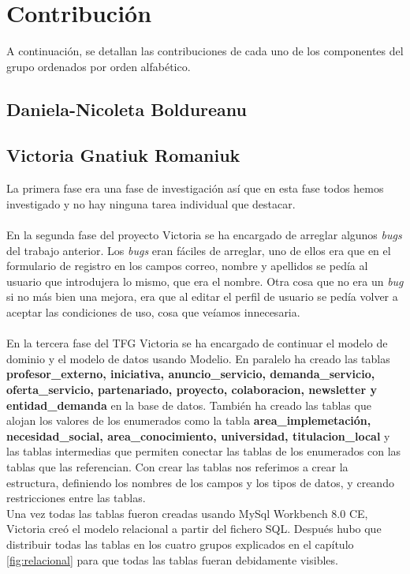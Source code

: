 \documentclass[11pt]{book}
\begin{document}
	\chapter{Contribución}
	A continuación, se detallan las contribuciones de cada uno de los componentes del grupo ordenados por orden alfabético.
	\section{Daniela-Nicoleta Boldureanu}
	\section{Victoria Gnatiuk Romaniuk}
	La primera fase era una fase de investigación así que en esta fase todos hemos investigado y no hay ninguna tarea individual que destacar.\\\\
	En la segunda fase del proyecto Victoria se ha encargado de arreglar algunos \textit{bugs} del trabajo anterior. Los \textit{bugs} eran fáciles de arreglar, uno de ellos era que en el formulario de registro en los campos correo, nombre y apellidos se pedía al usuario que introdujera lo mismo, que era el nombre. Otra cosa que no era un \textit{bug} si no más bien una mejora, era que al editar el perfil de usuario se pedía volver a aceptar las condiciones de uso, cosa que veíamos innecesaria.\\\\
	En la tercera fase del TFG Victoria se ha encargado de continuar el modelo de dominio y el modelo de datos usando Modelio. En paralelo ha creado las tablas \textbf{profesor\_externo, iniciativa, anuncio\_servicio, demanda\_servicio, oferta\_servicio, partenariado, proyecto, colaboracion, newsletter y entidad\_demanda} en la base de datos. También ha creado las tablas que alojan los valores de los enumerados como la tabla \textbf{area\_implemetación, necesidad\_social, area\_conocimiento, universidad, titulacion\_local} y las tablas intermedias que permiten conectar las tablas de los enumerados con las tablas que las referencian. Con crear las tablas nos referimos a crear la estructura, definiendo los nombres de los campos y los tipos de datos, y creando restricciones entre las tablas.\\
	Una vez todas las tablas fueron creadas usando MySql Workbench 8.0 CE, Victoria creó el modelo relacional a partir del fichero SQL. Después hubo que distribuir todas las tablas en los cuatro grupos explicados en el capítulo \ref{fig:relacional} para que todas las tablas fueran debidamente visibles.\\\\
\end{document}
